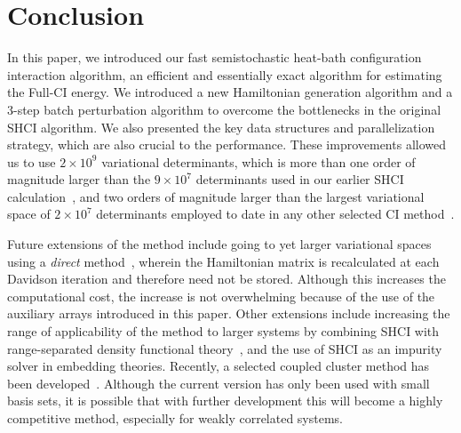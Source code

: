 \documentclass[%
reprint,
 superscriptaddress,
 amsmath,amssymb,
 aps,
]{revtex4-1}
\begin{document}
\section{Conclusion}
\label{conclusion}
In this paper, we introduced our fast semistochastic heat-bath configuration interaction algorithm, an efficient and essentially exact algorithm for estimating the Full-CI energy.
We introduced a new Hamiltonian generation algorithm and a 3-step batch perturbation algorithm to overcome the bottlenecks in the original SHCI algorithm.
We also presented the key data structures and parallelization strategy, which are also crucial to the performance.
These improvements allowed us to use $2 \times 10^9$ variational determinants, which is more than one order of magnitude larger than the $9\times 10^7$ determinants
used in our earlier SHCI calculation~\cite{ChiHolOttUmrShaZim-JPCA-18}, and two orders of magnitude larger than the largest variational space of $2\times 10^7$ determinants
employed to date in any other selected CI method~\cite{GarSceLooCaf-JCP-17}.

Future extensions of the method include going to yet larger variational spaces using a \emph{direct} method~\cite{Knowles1984,IvaRue-TCA-01}, wherein the Hamiltonian matrix is recalculated at each Davidson iteration and therefore need not be stored.
Although this increases the computational cost, the increase is not overwhelming because of the use of the auxiliary arrays introduced in this paper.
Other extensions include increasing the range of applicability of the method to larger systems by combining SHCI with range-separated density functional theory~\cite{Sav-INC-96},
and the use of SHCI as an impurity solver in embedding theories.
{\color{black}
Recently, a selected coupled cluster method has been developed~\cite{XuUejTen-PRL-18}.
Although the current version has
only been used with small basis sets,
it is possible that with further development this will become a highly competitive method,
especially for weakly correlated systems.
}
\end{document}
